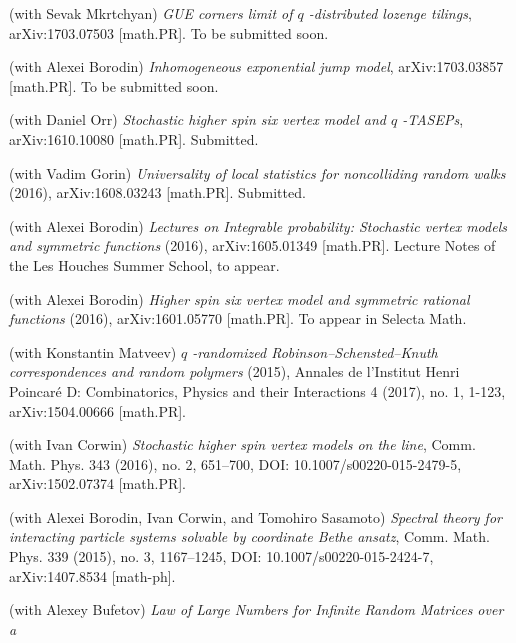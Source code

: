 \documentclass[letterpaper,11pt]{article}
\begin{document}
\begin{etaremune}
	\renewcommand{\labelenumi}{[\theenumi]}
	\item
	      (with Sevak Mkrtchyan)
	      \emph{GUE corners limit of
		      $q$%
		      -distributed lozenge
		      tilings},
	      arXiv:1703.07503 [math.PR]. To be submitted soon.
	\item
	      (with Alexei Borodin)
	      \emph{Inhomogeneous exponential jump model},
	      arXiv:1703.03857 [math.PR]. To be submitted soon.
	\item
	      (with Daniel Orr)
	      \emph{Stochastic higher spin six vertex model and
		      $q$%
		      -TASEPs},
	      arXiv:1610.10080 [math.PR]. Submitted.
	\item
	      (with Vadim Gorin)
	      \emph{Universality of local statistics for noncolliding random
		      walks}
	      (2016),
	      arXiv:1608.03243 [math.PR]. Submitted.
	\item
	      (with Alexei Borodin)
	      \emph{Lectures on Integrable probability: Stochastic vertex
		      models and
		      symmetric functions}
	      (2016), arXiv:1605.01349 [math.PR]. Lecture Notes of the Les
	      Houches
	      Summer School, to appear.
	\item
	      (with Alexei Borodin)
	      \emph{Higher spin six vertex model and symmetric rational
		      functions}
	      (2016),
	      arXiv:1601.05770 [math.PR]. To appear in Selecta Math.
	\item
	      (with Konstantin Matveev)
	      \emph{$q$%
		      -randomized Robinson--Schensted--Knuth correspondences
		      and random
		      polymers}
	      (2015),
	      Annales de l'Institut Henri Poincar\'e D:
	      Combinatorics, Physics and their Interactions
	      4 (2017), no. 1, 1-123,
	      arXiv:1504.00666 [math.PR].
	\item
	      (with Ivan Corwin)
	      \emph{Stochastic higher spin vertex models on the line},
	      Comm. Math. Phys.
	      343 (2016), no. 2,
	      651--700,
	      DOI: 10.1007/s00220-015-2479-5,
	      arXiv:1502.07374 [math.PR].
	\item
	      (with Alexei Borodin, Ivan Corwin, and Tomohiro Sasamoto)
	      \emph{Spectral theory for interacting particle systems solvable
		      by
		      coordinate Bethe ansatz},
	      Comm. Math. Phys.
	      339 (2015), no. 3,
	      1167--1245,
	      DOI: 10.1007/s00220-015-2424-7,
	      arXiv:1407.8534 [math-ph].
	\item
	      (with Alexey Bufetov)
	      \emph{Law of Large Numbers for Infinite Random Matrices over a
}
\end{etaremune}
\end{document}
